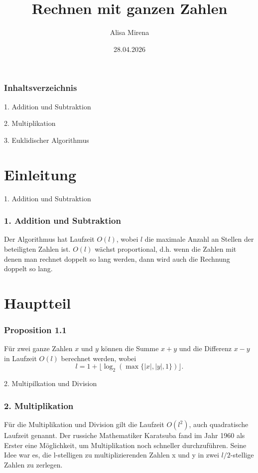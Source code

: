 \documentclass[10pt]{beamer}
\title{Rechnen mit ganzen Zahlen}
\author{Alisa Mirena}
\date{28.04.2026}
\begin{document}
\frame{\titlepage}

\begin{frame}
\frametitle{Inhaltsverzeichnis}

1. Addition und Subtraktion

2. Multiplikation

3. Euklidischer Algorithmus

\end{frame}

\section{Einleitung}

\begin{frame}

\Large  %
 
1. Addition und Subtraktion
    
\end{frame}



\begin{frame}
\frametitle{1. Addition und Subtraktion}
Der Algorithmus hat Laufzeit $O(l)$, wobei $l$ die maximale Anzahl an Stellen der beteiligten Zahlen ist. $O(l)$ wächst proportional, d.h. wenn die Zahlen mit denen man rechnet doppelt so lang werden, dann wird auch die Rechnung doppelt so lang.
\end{frame}

\section{Hauptteil}

\begin{frame}
\frametitle{Proposition 1.1 }

Für zwei ganze Zahlen $x$ und $y$ können die Summe $x+y$ und die Differenz $x-y$ in Laufzeit $O(l)$ berechnet werden, wobei
\[
l = 1 + \lfloor \log_2(\max\{|x|, |y|, 1\}) \rfloor.
\]


\end{frame}

\begin{frame}

\Large  %

2. Multipilkation und Division
    
\end{frame}



\begin{frame}
\frametitle{2. Multiplikation}
    Für die Multiplikation und Division gilt die Laufzeit $O(l^2)$, auch quadratische Laufzeit genannt. 
Der russiche Mathematiker Karatsuba fand im Jahr 1960 als Erster eine Möglichkeit, um Multiplikation noch schneller durchzuführen. Seine Idee war es, die l-stelligen zu multiplizierenden Zahlen x und y in zwei $l/2$-stellige Zahlen zu zerlegen. 
\end{frame}
\end{document}
